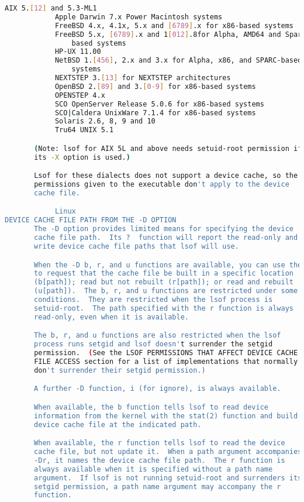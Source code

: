 {{\begin{lstlisting}[language=bash]
            AIX 5.[12] and 5.3-ML1
            Apple Darwin 7.x Power Macintosh systems
            FreeBSD 4.x, 4.1x, 5.x and [6789].x for x86-based systems
            FreeBSD 5.x, [6789].x and 1[012].8for Alpha, AMD64 and Sparc64
                based systems
            HP-UX 11.00
            NetBSD 1.[456], 2.x and 3.x for Alpha, x86, and SPARC-based
                systems
            NEXTSTEP 3.[13] for NEXTSTEP architectures
            OpenBSD 2.[89] and 3.[0-9] for x86-based systems
            OPENSTEP 4.x
            SCO OpenServer Release 5.0.6 for x86-based systems
            SCO|Caldera UnixWare 7.1.4 for x86-based systems
            Solaris 2.6, 8, 9 and 10
            Tru64 UNIX 5.1

       (Note: lsof for AIX 5L and above needs setuid-root permission if
       its -X option is used.)

       Lsof for these dialects does not support a device cache, so the
       permissions given to the executable don't apply to the device
       cache file.

            Linux
DEVICE CACHE FILE PATH FROM THE -D OPTION
       The -D option provides limited means for specifying the device
       cache file path.  Its ?  function will report the read-only and
       write device cache file paths that lsof will use.

       When the -D b, r, and u functions are available, you can use them
       to request that the cache file be built in a specific location
       (b[path]); read but not rebuilt (r[path]); or read and rebuilt
       (u[path]).  The b, r, and u functions are restricted under some
       conditions.  They are restricted when the lsof process is
       setuid-root.  The path specified with the r function is always
       read-only, even when it is available.

       The b, r, and u functions are also restricted when the lsof
       process runs setgid and lsof doesn't surrender the setgid
       permission.  (See the LSOF PERMISSIONS THAT AFFECT DEVICE CACHE
       FILE ACCESS section for a list of implementations that normally
       don't surrender their setgid permission.)

       A further -D function, i (for ignore), is always available.

       When available, the b function tells lsof to read device
       information from the kernel with the stat(2) function and build a
       device cache file at the indicated path.

       When available, the r function tells lsof to read the device
       cache file, but not update it.  When a path argument accompanies
       -Dr, it names the device cache file path.  The r function is
       always available when it is specified without a path name
       argument.  If lsof is not running setuid-root and surrenders its
       setgid permission, a path name argument may accompany the r
       function.


\end{lstlisting}}}
